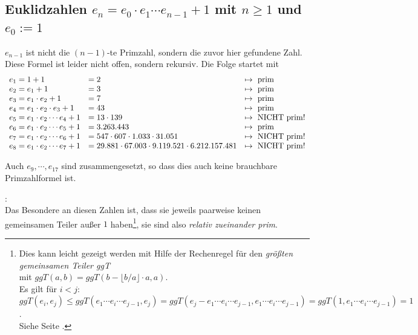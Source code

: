 \begin{refsegment}
\subsection[Euklidzahlen \texorpdfstring{$e_n = e_0 \cdot e_1 \cdots e_{n-1} + 1$}{e\_n = e\_0 ... e\_1 ... e\_n-1 + 1}]
              {Euklidzahlen $e_n = e_0 \cdot e_1 \cdots e_{n-1} + 1$
	       mit $ n \geq 1 $ und $ e_0 := 1 $}
    $e_{n-1}$ ist nicht die $(n-1)$-te Primzahl, sondern die zuvor hier
    gefundene Zahl.
    Diese Formel ist leider nicht offen, sondern rekursiv.
    Die Folge startet mit
$$
\begin{array}{lll}
e_1 = 1 + 1 &   = 2 &   \mapsto {\rm ~prim} \\
e_2 = e_1 + 1   &   = 3 &   \mapsto {\rm ~prim} \\
e_3 = e_1 \cdot e_2 + 1 &   = 7 &   \mapsto {\rm ~prim} \\
e_4 = e_1 \cdot e_2 \cdot e_3 + 1 & = 43 &  \mapsto {\rm ~prim} \\
e_5 = e_1 \cdot e_2 \cdots e_4 + 1 &    = 13 \cdot 139 &    \mapsto {\rm ~NICHT~prim} ! \\
e_6 = e_1 \cdot e_2 \cdots e_5 + 1 &    = 3.263.443 &   \mapsto {\rm ~prim} \\
e_7 = e_1 \cdot e_2 \cdots e_6 + 1 &    = 547 \cdot 607 \cdot 1.033 \cdot 31.051 & \mapsto {\rm ~NICHT~prim} ! \\
e_8 = e_1 \cdot e_2 \cdots e_7 + 1 &    = 29.881\cdot 67.003 \cdot 9.119.521 \cdot 6.212.157.481 & \mapsto {\rm ~NICHT~prim} !
\end{array}
$$

 Auch $e_9, \cdots, e_{17}$ sind zusammengesetzt, so dass dies auch
keine brauchbare Primzahlformel ist.

\begin{remark}{:}\\
Das Besondere an diesen Zahlen ist, dass sie jeweils paarweise
keinen gemeinsamen Teiler außer $1$ haben\footnote{%
Dies kann leicht gezeigt werden mit Hilfe der Rechenregel für den
{\em größten gemeinsamen Teiler ggT} \\
mit $ggT(a,b) = ggT(b-\lfloor b/a\rfloor \cdot a, a)$.\\
Es gilt für $i<j$: \\
$ggT(e_i,e_j) \le ggT(e_1 \cdots e_i \cdots e_{j-1}, e_j) = ggT(e_j - e_1 \cdots e_i \cdots e_{j-1}, e_1 \cdots e_i \cdots e_{j-1})
= ggT(1, e_1 \cdots e_i \cdots e_{j-1}) = 1$.\\
Siehe Seite \pageref{nt:NumberTheory_Appendix_GCD}.  %
}, sie sind also%
 {\em relativ zueinander prim}.
\end{remark}


\end{refsegment}
